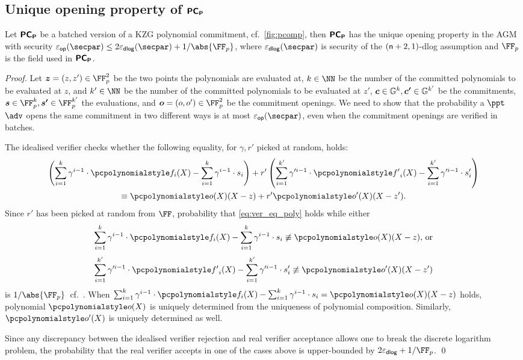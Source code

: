 \documentclass[runningheads,11pt]{llncs}
\let\spvec\vec
\let\vec\accentvec
\let\spvec\vec
\let\vec\spvec
\def\vec#1{\mathchoice{\mbox{\boldmath$\displaystyle#1$}}
  {\mbox{\boldmath$\textstyle#1$}} {\mbox{\boldmath$\scriptstyle#1$}}
  {\mbox{\boldmath$\scriptscriptstyle#1$}}}
\begin{document}
\subsection{Unique opening property of $\bm{\mathsf{PC}}_{\bm{\mathsf{P}}}$}
\begin{lemma}
\label{lem:pcomp_op}
Let $\bm{\mathsf{PC}}_{\bm{\mathsf{P}}}$ be a batched version of a KZG polynomial commitment,
cf.~\cref{fig:pcomp}, then $\bm{\mathsf{PC}}_{\bm{\mathsf{P}}}$ has the unique opening property in the AGM
with security
$\epsop(\secpar) \leq 2 \epsdlog(\secpar) + \infrac{1}{\abs{\FF_p}}$, where
$\epsdlog(\secpar)$ is security of the $(\mathsf{n} + 2, 1)$-dlog assumption and
$\FF_p$ is the field used in $\bm{\mathsf{PC}}_{\bm{\mathsf{P}}}$.\end{lemma}
\begin{proof}
  Let $\vec{z} = (z, z') \in \FF_p^2$ be the two points the polynomials are
  evaluated at, $k \in \NN$ be the number of the committed polynomials to be
  evaluated at $z$, and $k' \in \NN$ be the number of the committed polynomials
  to be evaluated at $z'$, $\vec{c} \in \GRP^k, \vec{c'} \in \GRP^{k'}$ be the
  commitments, $\vec{s} \in \FF_p^k, \vec{s'} \in \FF_p^{k'}$ the evaluations,
  and $\vec{o} = (o, o') \in \FF_p^2$ be the commitment openings.  We need to
  show that the probability a $\ppt$ $\adv$ opens the same commitment in two
  different ways is at most $\epsop(\secpar)$, even when the commitment openings
  are verified in batches.

  The idealised verifier checks whether the following equality, for $\gamma, r'$
  picked at random, holds:
  \begin{multline}
    \label{eq:ver_eq_poly}
    \left(\sum_{i = 1}^{k} \gamma^{i - 1} \cdot \p{f}_i(X) - \sum_{i = 1}^{k}
      \gamma^{i - 1} \cdot s_i\right) + r' \left(\sum_{i = 1}^{k'} \gamma'^{i -
        1} \cdot \p{f'}_i(X) -
      \sum_{i = 1}^{k'} \gamma'^{i - 1} \cdot s'_i \right)\\
    \equiv \p{o}(X)(X - z) + r' \p{o}'(X)(X- z').
  \end{multline}
  Since $r'$ has been picked at random from $\FF$, probability that
  \cref{eq:ver_eq_poly} holds while either
  \[
    \sum_{i = 1}^{k} \gamma^{i - 1} \cdot \p{f}_i(X) - \sum_{i = 1}^{k}
    \gamma^{i - 1} \cdot s_i \not\equiv \p{o}(X)(X - z) \text{, or}
  \]
  \[
    \sum_{i = 1}^{k'} \gamma'^{i - 1} \cdot \p{f'}_i(X) - \sum_{i = 1}^{k'}
    \gamma'^{i - 1} \cdot s'_i \not\equiv \p{o'}(X)(X - z')
  \]
  is $\infrac{1}{\abs{\FF_p}}$~cf.~\cite{EPRINT:GabWilCio19}. 
  When \(
    \sum_{i = 1}^{k} \gamma^{i - 1} \cdot \p{f}_i(X) - \sum_{i = 1}^{k}
    \gamma^{i - 1} \cdot s_i = \p{o}(X)(X - z) 
  \)
  holds, polynomial $\p{o}(X)$ is uniquely determined from the uniqueness of
  polynomial composition. Similarly, $\p{o'}(X)$ is uniquely determined as well.

  Since any discrepancy
  between the idealised verifier rejection and real verifier acceptance allows
  one to break the discrete logarithm problem, the probability that the real
  verifier accepts in one of the cases above is upper-bounded by
  $2 \epsdlog + \infrac{1}{\FF_p}$.
  \qed
\end{proof}
\end{document}
